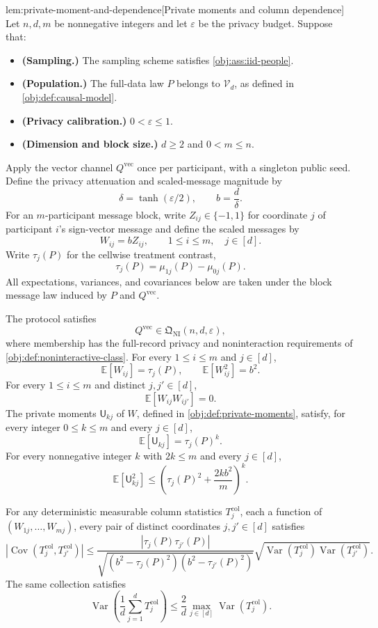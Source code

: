 \documentclass[11pt]{article}
\begin{document}
\begin{lemmav}{lem:private-moment-and-dependence}[Private moments and column dependence]
Let \(n,d,m\) be nonnegative integers and let \(\varepsilon\) be the privacy budget. Suppose that:
\begin{itemize}
\item \textbf{(Sampling.)} The sampling scheme satisfies \cref{obj:ass:iid-people}.
\item \textbf{(Population.)} The full-data law \(P\) belongs to \(\mathcal V_d\), as defined in \cref{obj:def:causal-model}.
\item \textbf{(Privacy calibration.)} \(0<\varepsilon\le1\).
\item \textbf{(Dimension and block size.)} \(d\ge2\) and \(0<m\le n\).
\end{itemize}
Apply the vector channel \(Q^{\mathrm{vec}}\) once per participant, with a singleton public seed. Define the privacy attenuation and scaled-message magnitude by
\[
\delta=\tanh(\varepsilon/2),
\qquad
b=\frac d\delta.
\]
For an \(m\)-participant message block, write \(Z_{ij}\in\{-1,1\}\) for coordinate \(j\) of participant \(i\)'s sign-vector message and define the scaled messages by
\[
W_{ij}=bZ_{ij},
\qquad 1\le i\le m,\quad j\in[d].
\]
Write \(\tau_j(P)\) for the cellwise treatment contrast,
\[
\tau_j(P)=\mu_{1j}(P)-\mu_{0j}(P).
\]
All expectations, variances, and covariances below are taken under the block message law induced by \(P\) and \(Q^{\mathrm{vec}}\).

The protocol satisfies
\[
Q^{\mathrm{vec}}\in\mathfrak Q_{\mathrm{NI}}(n,d,\varepsilon),
\]
where membership has the full-record privacy and noninteraction requirements of \cref{obj:def:noninteractive-class}. For every \(1\le i\le m\) and \(j\in[d]\),
\[
\mathbb E[W_{ij}]=\tau_j(P),
\qquad
\mathbb E[W_{ij}^{2}]=b^{2}.
\]
For every \(1\le i\le m\) and distinct \(j,j'\in[d]\),
\[
\mathbb E[W_{ij}W_{ij'}]=0.
\]
The private moments \(\mathsf U_{kj}\) of \(W\), defined in \cref{obj:def:private-moments}, satisfy, for every integer \(0\le k\le m\) and every \(j\in[d]\),
\[
\mathbb E[\mathsf U_{kj}]=\tau_j(P)^k.
\]
For every nonnegative integer \(k\) with \(2k\le m\) and every \(j\in[d]\),
\[
\mathbb E[\mathsf U_{kj}^{2}]
\le
\left(\tau_j(P)^2+\frac{2kb^2}{m}\right)^k.
\]

For any deterministic measurable column statistics \(T_j^{\mathrm{col}}\), each a function of \((W_{1j},\ldots,W_{mj})\), every pair of distinct coordinates \(j,j'\in[d]\) satisfies
\[
\left|\operatorname{Cov}
\left(T_j^{\mathrm{col}},T_{j'}^{\mathrm{col}}\right)\right|
\le
\frac{|\tau_j(P)\tau_{j'}(P)|}
{\sqrt{(b^2-\tau_j(P)^2)(b^2-\tau_{j'}(P)^2)}}
\sqrt{\operatorname{Var}(T_j^{\mathrm{col}})
      \operatorname{Var}(T_{j'}^{\mathrm{col}})}.
\]
The same collection satisfies
\[
\operatorname{Var}\left(\frac1d\sum_{j=1}^{d}T_j^{\mathrm{col}}\right)
\le
\frac2d\max_{j\in[d]}\operatorname{Var}(T_j^{\mathrm{col}}).
\]
\end{lemmav}
\end{document}
